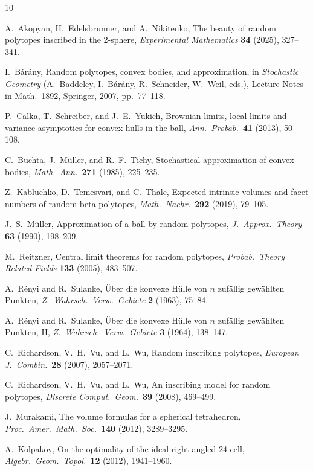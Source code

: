 \documentclass[11pt]{article}
\begin{document}
\begin{thebibliography}{10}

A.~Akopyan, H.~Edelsbrunner, and A.~Nikitenko,
The beauty of random polytopes inscribed in the 2-sphere,
\emph{Experimental Mathematics} \textbf{34} (2025), 327--341.

I.~B\'ar\'any,
Random polytopes, convex bodies, and approximation,
in \emph{Stochastic Geometry} (A.~Baddeley, I.~B\'ar\'any,
R.~Schneider, W.~Weil, eds.), Lecture Notes in Math.\ 1892,
Springer, 2007, pp.~77--118.

P.~Calka, T.~Schreiber, and J.~E.~Yukich,
Brownian limits, local limits and variance asymptotics for convex
hulls in the ball,
\emph{Ann.\ Probab.}\ \textbf{41} (2013), 50--108.

C.~Buchta, J.~M\"uller, and R.~F.~Tichy,
Stochastical approximation of convex bodies,
\emph{Math.\ Ann.}\ \textbf{271} (1985), 225--235.

Z.~Kabluchko, D.~Temesvari, and C.~Thal\"e,
Expected intrinsic volumes and facet numbers of random
beta-polytopes,
\emph{Math.\ Nachr.}\ \textbf{292} (2019), 79--105.

J.~S.~M\"uller,
Approximation of a ball by random polytopes,
\emph{J.\ Approx.\ Theory} \textbf{63} (1990), 198--209.

M.~Reitzner,
Central limit theorems for random polytopes,
\emph{Probab.\ Theory Related Fields} \textbf{133} (2005),
483--507.

A.~R\'enyi and R.~Sulanke,
\"Uber die konvexe H\"ulle von $n$ zuf\"allig gew\"ahlten Punkten,
\emph{Z.\ Wahrsch.\ Verw.\ Gebiete} \textbf{2} (1963), 75--84.

A.~R\'enyi and R.~Sulanke,
\"Uber die konvexe H\"ulle von $n$ zuf\"allig gew\"ahlten Punkten, II,
\emph{Z.\ Wahrsch.\ Verw.\ Gebiete} \textbf{3} (1964), 138--147.

C.~Richardson, V.~H.~Vu, and L.~Wu,
Random inscribing polytopes,
\emph{European J.\ Combin.}\ \textbf{28} (2007), 2057--2071.

C.~Richardson, V.~H.~Vu, and L.~Wu,
An inscribing model for random polytopes,
\emph{Discrete Comput.\ Geom.}\ \textbf{39} (2008), 469--499.

J.~Murakami,
The volume formulas for a spherical tetrahedron,
\emph{Proc.\ Amer.\ Math.\ Soc.}\ \textbf{140} (2012), 3289--3295.

A.~Kolpakov,
On the optimality of the ideal right-angled 24-cell,
\emph{Algebr.\ Geom.\ Topol.}\ \textbf{12} (2012), 1941--1960.

\end{thebibliography}
\end{document}
